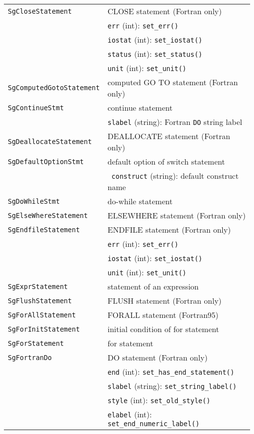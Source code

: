 \begin{longtable}[l]{l|p{10cm}}
 \texttt{SgCloseStatement}& CLOSE statement (Fortran only)\\
 & \texttt{err} (int): \texttt{set\_err()}\\
 & \texttt{iostat} (int): \texttt{set\_iostat()}\\
 & \texttt{status} (int): \texttt{set\_status()}\\
 & \texttt{unit} (int): \texttt{set\_unit()}\\
 \texttt{SgComputedGotoStatement}& computed GO TO statement (Fortran only)\\
 \texttt{SgContinueStmt}& continue statement\\
 & \texttt{slabel} (string): Fortran \texttt{DO} string label\\
 \texttt{SgDeallocateStatement}& DEALLOCATE statement (Fortran only)\\
 \texttt{SgDefaultOptionStmt}& default option of switch statement\\
 & ~\texttt{construct} (string): default construct name\\
 \texttt{SgDoWhileStmt}& do-while statement\\
 \texttt{SgElseWhereStatement}& ELSEWHERE statement (Fortran only)\\
 \texttt{SgEndfileStatement}& ENDFILE statement (Fortran only)\\
 & \texttt{err} (int): \texttt{set\_err()}\\
 & \texttt{iostat} (int): \texttt{set\_iostat()}\\
 & \texttt{unit} (int): \texttt{set\_unit()}\\
 \texttt{SgExprStatement}& statement of an expression\\
 \texttt{SgFlushStatement}& FLUSH statement (Fortran only)\\
 \texttt{SgForAllStatement}& FORALL statement (Fortran95)\\
 \texttt{SgForInitStatement}& initial condition of for statement\\
 \texttt{SgForStatement}& for statement\\
 \texttt{SgFortranDo}& DO statement (Fortran only)\\
 & \texttt{end} (int): \texttt{set\_has\_end\_statement()}\\
 & \texttt{slabel} (string): \texttt{set\_string\_label()}\\
 & \texttt{style} (int): \texttt{set\_old\_style()}\\
 & \texttt{elabel} (int): \texttt{set\_end\_numeric\_label()}\\

\end{longtable}
